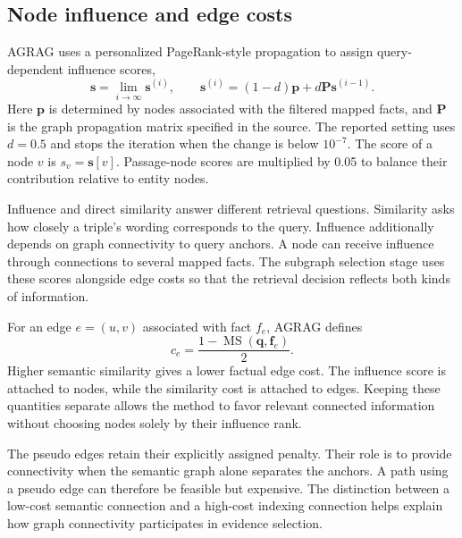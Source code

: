 \subsection{Node influence and edge costs}
AGRAG uses a personalized PageRank-style propagation to assign query-dependent influence scores,
\begin{equation}
\mathbf{s}=\lim_{i\rightarrow\infty}\mathbf{s}^{(i)},\qquad
\mathbf{s}^{(i)}=(1-d)\mathbf{p}+d\mathbf{P}\mathbf{s}^{(i-1)}.
\label{eq:agrag:propagation}
\end{equation}
Here $\mathbf{p}$ is determined by nodes associated with the filtered mapped facts, and $\mathbf{P}$ is the graph propagation matrix specified in the source. The reported setting uses $d=0.5$ and stops the iteration when the change is below $10^{-7}$. The score of a node $v$ is $s_v=\mathbf{s}[v]$. Passage-node scores are multiplied by 0.05 to balance their contribution relative to entity nodes.

Influence and direct similarity answer different retrieval questions. Similarity asks how closely a triple's wording corresponds to the query. Influence additionally depends on graph connectivity to query anchors. A node can receive influence through connections to several mapped facts. The subgraph selection stage uses these scores alongside edge costs so that the retrieval decision reflects both kinds of information.

For an edge $e=(u,v)$ associated with fact $f_e$, AGRAG defines
\begin{equation}
c_e=\frac{1-\operatorname{MS}(\mathbf{q},\mathbf{f}_e)}{2}.
\label{eq:agrag:edge-cost}
\end{equation}
Higher semantic similarity gives a lower factual edge cost. The influence score is attached to nodes, while the similarity cost is attached to edges. Keeping these quantities separate allows the method to favor relevant connected information without choosing nodes solely by their influence rank.

The pseudo edges retain their explicitly assigned penalty. Their role is to provide connectivity when the semantic graph alone separates the anchors. A path using a pseudo edge can therefore be feasible but expensive. The distinction between a low-cost semantic connection and a high-cost indexing connection helps explain how graph connectivity participates in evidence selection.

